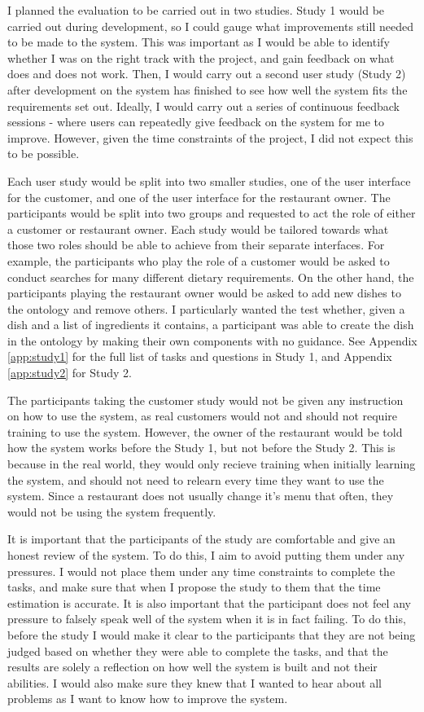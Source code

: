 I planned the evaluation to be carried out in two studies. Study 1 would be carried out during development, so I could gauge what improvements still needed to be made to the system. This was important as I would be able to identify whether I was on the right track with the project, and gain feedback on what does and does not work. Then, I would carry out a second user study (Study 2) after development on the system has finished to see how well the system fits the requirements set out. Ideally, I would carry out a series of continuous feedback sessions - where users can repeatedly give feedback on the system for me to improve. However, given the time constraints of the project, I did not expect this to be possible.

Each user study would be split into two smaller studies, one of the user interface for the customer, and one of the user interface for the restaurant owner. The participants would be split into two groups and requested to act the role of either a customer or restaurant owner. Each study would be tailored towards what those two roles should be able to achieve from their separate interfaces. For example, the participants who play the role of a customer would be asked to conduct searches for many different dietary requirements. On the other hand, the participants playing the restaurant owner would be asked to add new dishes to the ontology and remove others. I particularly wanted the test whether, given a dish and a list of ingredients it contains, a participant was able to create the dish in the ontology by making their own components with no guidance. See Appendix \ref{app:study1} for the full list of tasks and questions in Study 1, and Appendix \ref{app:study2} for Study 2.

The participants taking the customer study would not be given any instruction on how to use the system, as real customers would not and should not require training to use the system. However, the owner of the restaurant would be told how the system works before the Study 1, but not before the Study 2. This is because in the real world, they would only recieve training when initially learning the system, and should not need to relearn every time they want to use the system. Since a restaurant does not usually change it's menu that often, they would not be using the system frequently.

It is important that the participants of the study are comfortable and give an honest review of the system. To do this, I aim to avoid putting them under any pressures. I would not place them under any time constraints to complete the tasks, and make sure that when I propose the study to them that the time estimation is accurate. It is also important that the participant does not feel any pressure to falsely speak well of the system when it is in fact failing. To do this, before the study I would make it clear to the participants that they are not being judged based on whether they were able to complete the tasks, and that the results are solely a reflection on how well the system is built and not their abilities. I would also make sure they knew that I wanted to hear about all problems as I want to know how to improve the system.

